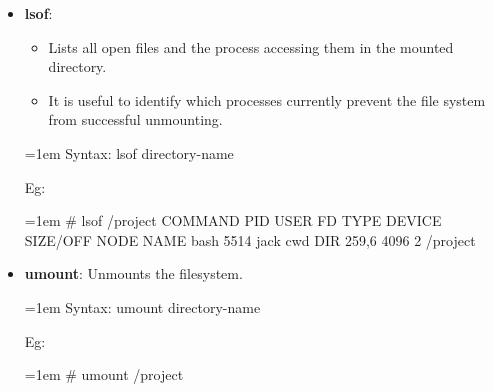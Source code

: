\setlength{\columnsep}{3pt}
\begin{flushleft}
	

	\begin{itemize}
		\item \textbf{lsof}: 
		\begin{itemize}
			\item Lists all open files and the process accessing them in the mounted directory.
			\item It is useful to identify which processes currently prevent the file system from successful unmounting.
		\end{itemize}
		 
		\begin{tcolorbox}[breakable,notitle,boxrule=-0pt,colback=pink,colframe=pink]
			\color{black}
			\font=1em
			Syntax: lsof directory-name
			\font=4pt
		\end{tcolorbox}
		Eg:	
		\bigskip
		\begin{tcolorbox}[breakable,notitle,boxrule=-0pt,colback=black,colframe=black]
			\color{green}
			\font=1em
			\# lsof /project
			\newline
			\color{white}
			COMMAND  PID USER   FD   TYPE DEVICE SIZE/OFF NODE NAME
			\newline
			bash    5514 jack  cwd    DIR  259,6     4096    2 /project
			\font=4pt
		\end{tcolorbox}
		\bigskip
		\bigskip
		
		\item \textbf{umount}: Unmounts the filesystem.
		\begin{tcolorbox}[breakable,notitle,boxrule=-0pt,colback=pink,colframe=pink]
			\color{black}
			\font=1em
			Syntax: umount directory-name
			\font=4pt
		\end{tcolorbox}
		Eg:	
		\bigskip
		\begin{tcolorbox}[breakable,notitle,boxrule=-0pt,colback=black,colframe=black]
			\color{green}
			\font=1em
			\# umount /project
			\font=4pt
		\end{tcolorbox}
	\end{itemize}	
	
	
\end{flushleft}

\newpage

